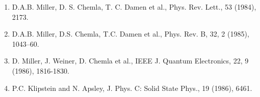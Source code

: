 {\small \begin{enumerate} \item D.A.B. Miller, D. S. Chemla, T. C. Damen et al., Phys. Rev. Lett., 53 (1984), 2173.\item D.A.B. Miller, D.S. Chemla, T.C. Damen et al., Phys. Rev. B, 32, 2 (1985), 1043–60.\item D. Miller, J. Weiner, D. Chemla et al., IEEE J. Quantum Electronics, 22, 9 (1986), 1816-1830.\item P.C. Klipstein and N. Apsley, J. Phys. C: Solid State Phys., 19 (1986), 6461.\end{enumerate}}